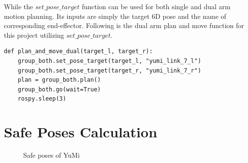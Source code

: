 While the $set\_pose\_target$ function can be used for both single and dual arm motion planning. Its inputs are simply the target 6D pose and the name of corresponding end-effector. Following is the dual arm plan and move function for this project utilizing $set\_pose\_target$. 

\begin{verbatim}
def plan_and_move_dual(target_l, target_r):
    group_both.set_pose_target(target_l, "yumi_link_7_l")
    group_both.set_pose_target(target_r, "yumi_link_7_r")
    plan = group_both.plan()
    group_both.go(wait=True)
    rospy.sleep(3)
\end{verbatim}



\section{Safe Poses Calculation} \label{safetyposescalculation}

\begin{figure}[H]
\centering
{}
\caption{Safe poses of YuMi}
\label{safeposition}
\end{figure}


